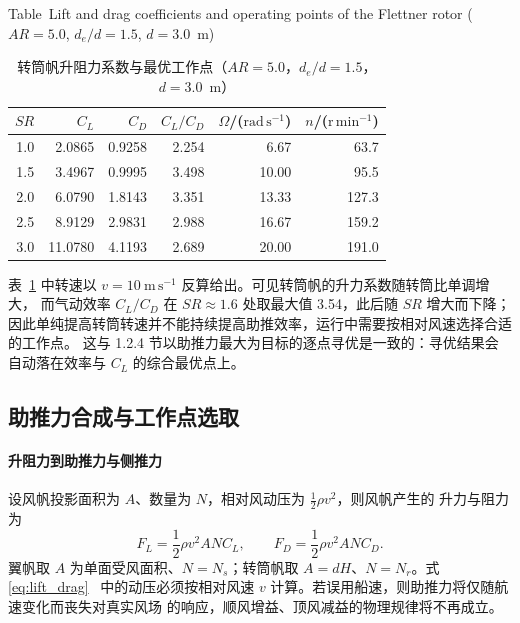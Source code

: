 \documentclass[UTF8,a4paper,twoside,zihao=5,fontset=windows]{ctexart}
\begin{document}
\begin{table}[htbp]
\centering
\small
\setlength{\tabcolsep}{6pt}
\renewcommand{\arraystretch}{1.35}
\caption{转筒帆升阻力系数与最优工作点（$AR=5.0$，$d_e/d=1.5$，$d=3.0$~m）}
{\small Table~\thetable\quad Lift and drag coefficients and operating points of the Flettner rotor ($AR=5.0$, $d_e/d=1.5$, $d=3.0$~m)\par}
\smallskip
\label{tab:rotor_polar}
\begin{tabular}{@{}rrrrrr@{}}
\toprule
$SR$ & $C_L$ & $C_D$ & $C_L/C_D$ & $\Omega$/($\mathrm{rad\,s^{-1}}$) & $n$/($\mathrm{r\,min^{-1}}$) \\
\midrule
1.0 & 2.0865 & 0.9258 & 2.254 & 6.67 & 63.7 \\
1.5 & 3.4967 & 0.9995 & 3.498 & 10.00 & 95.5 \\
2.0 & 6.0790 & 1.8143 & 3.351 & 13.33 & 127.3 \\
2.5 & 8.9129 & 2.9831 & 2.988 & 16.67 & 159.2 \\
3.0 & 11.0780 & 4.1193 & 2.689 & 20.00 & 191.0 \\
\bottomrule
\end{tabular}
\end{table}
\FloatBarrier

表~\ref{tab:rotor_polar} 中转速以
$v=10\ \mathrm{m\,s^{-1}}$ 反算给出。可见转筒帆的升力系数随转筒比单调增大，
而气动效率 $C_L/C_D$ 在 $SR\approx1.6$ 处取最大值 3.54，此后随 $SR$ 增大而下降；
因此单纯提高转筒转速并不能持续提高助推效率，运行中需要按相对风速选择合适的工作点。
这与 1.2.4 节以助推力最大为目标的逐点寻优是一致的：寻优结果会自动落在效率与
$C_L$ 的综合最优点上。

\subsection{助推力合成与工作点选取}
\label{sec:sail_operating_point}

\paragraph{升阻力到助推力与侧推力}
设风帆投影面积为 $A$、数量为 $N$，相对风动压为 $\tfrac{1}{2}\rho v^2$，则风帆产生的
升力与阻力为
\begin{equation}
F_L=\frac{1}{2}\rho v^2ANC_L,
\qquad
F_D=\frac{1}{2}\rho v^2ANC_D .
\label{eq:lift_drag}
\end{equation}
翼帆取 $A$ 为单面受风面积、$N=N_s$；转筒帆取 $A=dH$、$N=N_r$。式\eqref{eq:lift_drag}~
中的动压必须按相对风速 $v$ 计算。若误用船速，则助推力将仅随航速变化而丧失对真实风场
的响应，顺风增益、顶风减益的物理规律将不再成立。
\end{document}
